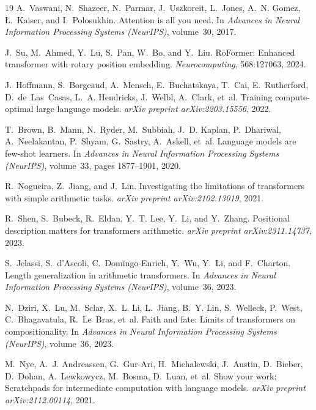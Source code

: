 \documentclass[10pt,twocolumn]{article}
\begin{document}
\begin{thebibliography}{19}
\small
{}
A.~Vaswani, N.~Shazeer, N.~Parmar, J.~Uszkoreit, L.~Jones, A.~N. Gomez, \L.~Kaiser, and I.~Polosukhin.
\newblock Attention is all you need.
\newblock In \emph{Advances in Neural Information Processing Systems (NeurIPS)}, volume~30, 2017.

J.~Su, M.~Ahmed, Y.~Lu, S.~Pan, W.~Bo, and Y.~Liu.
\newblock RoFormer: Enhanced transformer with rotary position embedding.
\newblock \emph{Neurocomputing}, 568:127063, 2024.

J.~Hoffmann, S.~Borgeaud, A.~Mensch, E.~Buchatskaya, T.~Cai, E.~Rutherford, D.~de~Las~Casas, L.~A. Hendricks, J.~Welbl, A.~Clark, et~al.
\newblock Training compute-optimal large language models.
\newblock \emph{arXiv preprint arXiv:2203.15556}, 2022.

T.~Brown, B.~Mann, N.~Ryder, M.~Subbiah, J.~D. Kaplan, P.~Dhariwal, A.~Neelakantan, P.~Shyam, G.~Sastry, A.~Askell, et~al.
\newblock Language models are few-shot learners.
\newblock In \emph{Advances in Neural Information Processing Systems (NeurIPS)}, volume~33, pages 1877--1901, 2020.

R.~Nogueira, Z.~Jiang, and J.~Lin.
\newblock Investigating the limitations of transformers with simple arithmetic tasks.
\newblock \emph{arXiv preprint arXiv:2102.13019}, 2021.

R.~Shen, S.~Bubeck, R.~Eldan, Y.~T. Lee, Y.~Li, and Y.~Zhang.
\newblock Positional description matters for transformers arithmetic.
\newblock \emph{arXiv preprint arXiv:2311.14737}, 2023.

S.~Jelassi, S.~d'Ascoli, C.~Domingo-Enrich, Y.~Wu, Y.~Li, and F.~Charton.
\newblock Length generalization in arithmetic transformers.
\newblock In \emph{Advances in Neural Information Processing Systems (NeurIPS)}, volume~36, 2023.

N.~Dziri, X.~Lu, M.~Sclar, X.~L. Li, L.~Jiang, B.~Y. Lin, S.~Welleck, P.~West, C.~Bhagavatula, R.~Le~Bras, et~al.
\newblock Faith and fate: Limits of transformers on compositionality.
\newblock In \emph{Advances in Neural Information Processing Systems (NeurIPS)}, volume~36, 2023.

M.~Nye, A.~J. Andreassen, G.~Gur-Ari, H.~Michalewski, J.~Austin, D.~Bieber, D.~Dohan, A.~Lewkowycz, M.~Bosma, D.~Luan, et~al.
\newblock Show your work: Scratchpads for intermediate computation with language models.
\newblock \emph{arXiv preprint arXiv:2112.00114}, 2021.


\end{thebibliography}
\end{document}
